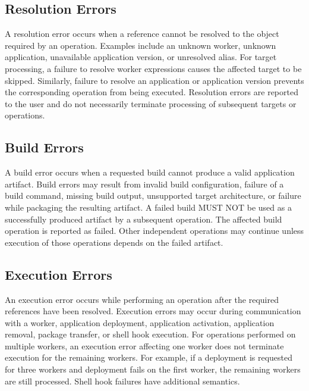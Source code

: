 \documentclass[11pt,a4paper]{article}
\begin{document}
    \subsection{Resolution Errors}\label{subsec:resolution-errors}

    A resolution error occurs when a reference cannot be resolved to the object required by an operation.
    Examples include an unknown worker, unknown application, unavailable application version, or unresolved alias.
    For target processing, a failure to resolve worker expressions causes the affected target to be skipped.
    Similarly, failure to resolve an application or application version prevents the corresponding operation from being executed.
    Resolution errors are reported to the user and do not necessarily terminate processing of subsequent targets or operations.

    \subsection{Build Errors}\label{subsec:build-errors}

    A build error occurs when a requested build cannot produce a valid application artifact.
    Build errors may result from invalid build configuration, failure of a build command, missing build output, unsupported target architecture, or failure while packaging the resulting artifact.
    A failed build MUST NOT be used as a successfully produced artifact by a subsequent operation.
    The affected build operation is reported as failed.
    Other independent operations may continue unless execution of those operations depends on the failed artifact.

    \subsection{Execution Errors}\label{subsec:execution-errors}

    An execution error occurs while performing an operation after the required references have been resolved.
    Execution errors may occur during communication with a worker, application deployment, application activation, application removal, package transfer, or shell hook execution.
    For operations performed on multiple workers, an execution error affecting one worker does not terminate execution for the remaining workers.
    For example, if a deployment is requested for three workers and deployment fails on the first worker, the remaining workers are still processed.
    Shell hook failures have additional semantics.
\end{document}
